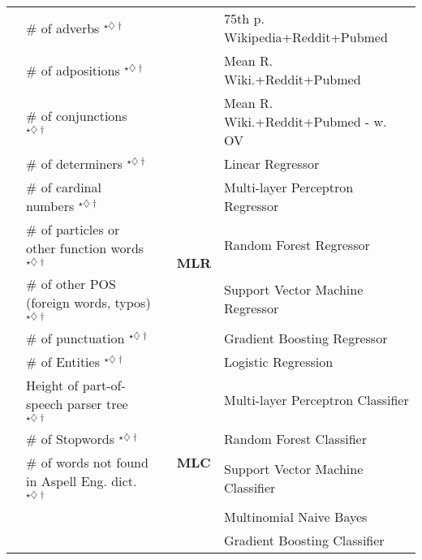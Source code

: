 \begin{table*}[tb]
{\begin{tabular}{llcll}
 & \# of adverbs $^{\star\diamondsuit\dagger}$  &  &  & 75th p. Wikipedia+Reddit+Pubmed \tabularnewline
 & \# of adpositions $^{\star\diamondsuit\dagger}$  &  &  & Mean R. Wiki.+Reddit+Pubmed \tabularnewline
 & \# of conjunctions $^{\star\diamondsuit\dagger}$  &  &  & Mean R. Wiki.+Reddit+Pubmed - w. OV \tabularnewline
\cline{4-5}
 & \# of determiners $^{\star\diamondsuit\dagger}$  &  & \multirow{6}{*}{\textbf{MLR}}  & Linear Regressor\tabularnewline
 & \# of cardinal numbers $^{\star\diamondsuit\dagger}$  &  &  & Multi-layer Perceptron Regressor\tabularnewline
 & \# of particles or other function words $^{\star\diamondsuit\dagger}$  &  &  & Random Forest Regressor\tabularnewline
 & \# of other POS (foreign words, typos) $^{\star\diamondsuit\dagger}$  &  &  & Support Vector Machine Regressor\tabularnewline
 & \# of punctuation $^{\star\diamondsuit\dagger}$  &  &  & Gradient Boosting Regressor\tabularnewline
 & \# of Entities $^{\star\diamondsuit\dagger}$  &  &  & Logistic Regression\tabularnewline
\cline{4-5}
 & Height of part-of-speech parser tree $^{\star\diamondsuit\dagger}$  &  & \multirow{5}{*}{\textbf{MLC}}  & Multi-layer Perceptron Classifier\tabularnewline
 & \# of Stopwords $^{\star\diamondsuit\dagger}$  &  &  & Random Forest Classifier\tabularnewline
 & \# of words not found in Aspell Eng. dict. $^{\star\diamondsuit\dagger}$  &  &  & Support Vector Machine Classifier\tabularnewline
 &  &  &  & Multinomial Naive Bayes\tabularnewline
 &  &  &  & Gradient Boosting Classifier\tabularnewline
\hline 
\end{tabular}} \vspace{-12pt}
 
\end{table*}
